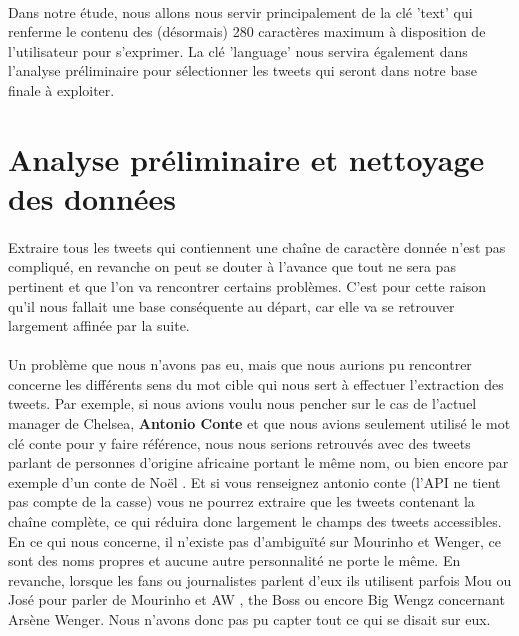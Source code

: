\documentclass[14pt, openany]{article}
\begin{document}
\paragraph{}
Dans notre étude, nous allons nous servir principalement de la clé 'text' qui renferme le contenu des (désormais) 280 caractères maximum à disposition de l'utilisateur pour s'exprimer. La clé 'language' nous servira également dans l'analyse préliminaire pour sélectionner les tweets qui seront dans notre base finale à exploiter.
\section{Analyse préliminaire et nettoyage des données}
\paragraph{}
Extraire tous les tweets qui contiennent une chaîne de caractère donnée n'est pas compliqué, en revanche on peut se douter à l'avance que tout ne sera pas pertinent et que l'on va rencontrer certains problèmes. C'est pour cette raison qu'il nous fallait une base conséquente au départ, car elle va se retrouver largement affinée par la suite.
\paragraph{}
Un problème que nous n'avons pas eu, mais que nous aurions pu rencontrer concerne les différents sens du mot cible qui nous sert à effectuer l'extraction des tweets. Par exemple, si nous avions voulu nous pencher sur le cas de l'actuel manager de Chelsea, \textbf{Antonio Conte} et que nous avions seulement utilisé le mot clé \og conte \fg{} pour y faire référence, nous nous serions retrouvés avec des tweets parlant de personnes d'origine africaine portant le même nom, ou bien encore par exemple d'un \og conte de Noël \fg{}. Et si vous renseignez \og antonio conte \fg{} (l'API ne tient pas compte de la casse) vous ne pourrez extraire que les tweets contenant la chaîne complète, ce qui réduira donc largement le champs des tweets accessibles.\\
En ce qui nous concerne, il n'existe pas d'ambiguïté sur Mourinho et Wenger, ce sont des noms propres et aucune autre personnalité ne porte le même. En revanche, lorsque les fans ou journalistes parlent d'eux ils utilisent parfois \og Mou \fg{} ou \og José \fg{} pour parler de Mourinho et \og AW \fg{}, \og the Boss \fg{} ou encore \og Big Wengz \fg{} concernant Arsène Wenger. Nous n'avons donc pas pu capter tout ce qui se disait sur eux.
\end{document}
